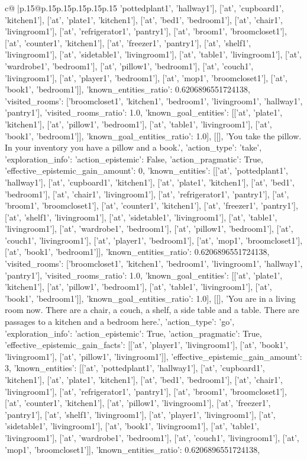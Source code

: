 \documentclass{article}
\begin{document}
{\begin{supertabular}{c@{$\;$}|p{.15\linewidth}@{}p{.15\linewidth}p{.15\linewidth}p{.15\linewidth}p{.15\linewidth}p{.15\linewidth}}
{{{'pottedplant1', 'hallway1'], ['at', 'cupboard1', 'kitchen1'], ['at', 'plate1', 'kitchen1'], ['at', 'bed1', 'bedroom1'], ['at', 'chair1', 'livingroom1'], ['at', 'refrigerator1', 'pantry1'], ['at', 'broom1', 'broomcloset1'], ['at', 'counter1', 'kitchen1'], ['at', 'freezer1', 'pantry1'], ['at', 'shelf1', 'livingroom1'], ['at', 'sidetable1', 'livingroom1'], ['at', 'table1', 'livingroom1'], ['at', 'wardrobe1', 'bedroom1'], ['at', 'pillow1', 'bedroom1'], ['at', 'couch1', 'livingroom1'], ['at', 'player1', 'bedroom1'], ['at', 'mop1', 'broomcloset1'], ['at', 'book1', 'bedroom1']], 'known_entities_ratio': 0.6206896551724138, 'visited_rooms': ['broomcloset1', 'kitchen1', 'bedroom1', 'livingroom1', 'hallway1', 'pantry1'], 'visited_rooms_ratio': 1.0, 'known_goal_entities': [['at', 'plate1', 'kitchen1'], ['at', 'pillow1', 'bedroom1'], ['at', 'table1', 'livingroom1'], ['at', 'book1', 'bedroom1']], 'known_goal_entities_ratio': 1.0}}], [[], 'You take the pillow. In your inventory you have a pillow and a book.', {'action_type': 'take', 'exploration_info': {'action_epistemic': False, 'action_pragmatic': True, 'effective_epistemic_gain_amount': 0, 'known_entities': [['at', 'pottedplant1', 'hallway1'], ['at', 'cupboard1', 'kitchen1'], ['at', 'plate1', 'kitchen1'], ['at', 'bed1', 'bedroom1'], ['at', 'chair1', 'livingroom1'], ['at', 'refrigerator1', 'pantry1'], ['at', 'broom1', 'broomcloset1'], ['at', 'counter1', 'kitchen1'], ['at', 'freezer1', 'pantry1'], ['at', 'shelf1', 'livingroom1'], ['at', 'sidetable1', 'livingroom1'], ['at', 'table1', 'livingroom1'], ['at', 'wardrobe1', 'bedroom1'], ['at', 'pillow1', 'bedroom1'], ['at', 'couch1', 'livingroom1'], ['at', 'player1', 'bedroom1'], ['at', 'mop1', 'broomcloset1'], ['at', 'book1', 'bedroom1']], 'known_entities_ratio': 0.6206896551724138, 'visited_rooms': ['broomcloset1', 'kitchen1', 'bedroom1', 'livingroom1', 'hallway1', 'pantry1'], 'visited_rooms_ratio': 1.0, 'known_goal_entities': [['at', 'plate1', 'kitchen1'], ['at', 'pillow1', 'bedroom1'], ['at', 'table1', 'livingroom1'], ['at', 'book1', 'bedroom1']], 'known_goal_entities_ratio': 1.0}}], [[], 'You are in a living room now. There are a chair, a couch, a shelf, a side table and a table. There are passages to a kitchen and a bedroom here.', {'action_type': 'go', 'exploration_info': {'action_epistemic': True, 'action_pragmatic': True, 'effective_epistemic_gain_facts': [['at', 'player1', 'livingroom1'], ['at', 'book1', 'livingroom1'], ['at', 'pillow1', 'livingroom1']], 'effective_epistemic_gain_amount': 3, 'known_entities': [['at', 'pottedplant1', 'hallway1'], ['at', 'cupboard1', 'kitchen1'], ['at', 'plate1', 'kitchen1'], ['at', 'bed1', 'bedroom1'], ['at', 'chair1', 'livingroom1'], ['at', 'refrigerator1', 'pantry1'], ['at', 'broom1', 'broomcloset1'], ['at', 'counter1', 'kitchen1'], ['at', 'pillow1', 'livingroom1'], ['at', 'freezer1', 'pantry1'], ['at', 'shelf1', 'livingroom1'], ['at', 'player1', 'livingroom1'], ['at', 'sidetable1', 'livingroom1'], ['at', 'book1', 'livingroom1'], ['at', 'table1', 'livingroom1'], ['at', 'wardrobe1', 'bedroom1'], ['at', 'couch1', 'livingroom1'], ['at', 'mop1', 'broomcloset1']], 'known_entities_ratio': 0.6206896551724138, }}}
\end{supertabular}}
\end{document}
